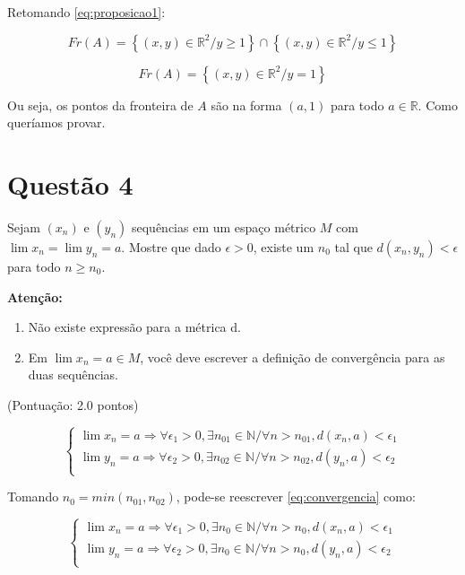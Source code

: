 \documentclass[10pt,a4paper]{article}
\begin{document}
	Retomando \ref{eq:proposicao1}:
	
	\begin{equation}
		Fr(A) = \left\{ (x, y) \in \mathbb{R}^2 / y \ge 1 \right\} \cap \left\{ (x, y) \in \mathbb{R}^2 / y \le 1 \right\}
	\end{equation}
	
	\begin{equation}
		Fr(A) = \left\{ (x, y) \in \mathbb{R}^2 / y = 1 \right\}
	\end{equation}
	
	Ou seja, os pontos da fronteira de $A$ são na forma $(a, 1)$ para todo $a \in \mathbb{R}$. Como queríamos provar.
	
	\section{Questão 4}
	
	Sejam $(x_n)$ e $(y_n)$ sequências em um espaço métrico $M$ com $ \lim x_n = \lim y_n = a $. Mostre que dado $ \epsilon > 0$, existe um $n_0$ tal que $d(x_n, y_n) < \epsilon$ para todo $ n \ge n_0$.
	
	\textbf{Atenção:}
	
	\begin{enumerate}[(1)]
		\item Não existe expressão para a métrica d.
		
		\item Em $\lim x_n = a \in M$, você deve escrever a definição de convergência para as duas sequências.
		
	\end{enumerate}

	(Pontuação: 2.0 pontos)
	
	\begin{equation} \label{eq:convergencia}
	\begin{cases}
	\lim x_n = a \Rightarrow \forall \epsilon_1 > 0, \exists n_{01} \in \mathbb{N} /\forall n > n_{01}, d(x_n, a) < \epsilon_1\\
	\lim y_n = a \Rightarrow \forall \epsilon_2 > 0, \exists n_{02} \in \mathbb{N} /\forall n > n_{02}, d(y_n, a) < \epsilon_2\\
	\end{cases}
	\end{equation}
	
	Tomando $n_0 = min(n_{01}, n_{02})$, pode-se reescrever \ref{eq:convergencia} como:
	
	\begin{equation} \label{eq:convergencia}
	\begin{cases}
	\lim x_n = a \Rightarrow \forall \epsilon_1 > 0, \exists n_{0} \in \mathbb{N} /\forall n > n_{0}, d(x_n, a) < \epsilon_1\\
	\lim y_n = a \Rightarrow \forall \epsilon_2 > 0, \exists n_{0} \in \mathbb{N} /\forall n > n_{0}, d(y_n, a) < \epsilon_2\\
	\end{cases}
	\end{equation}
	
\end{document}

